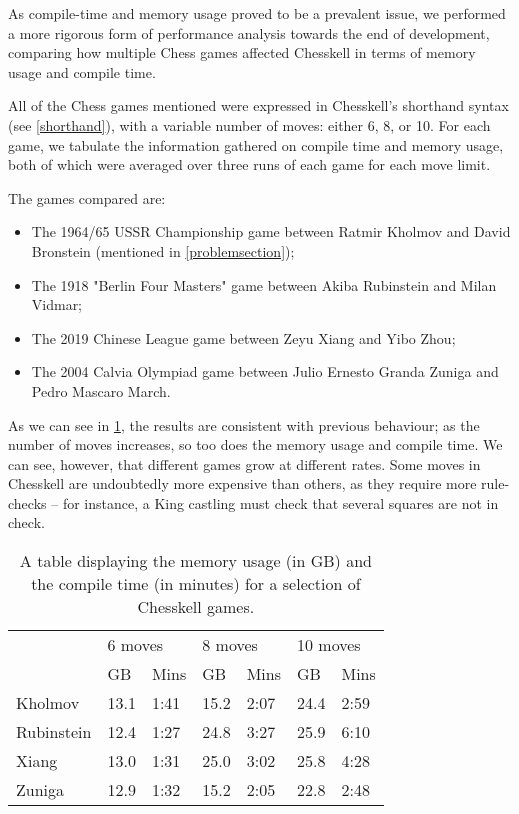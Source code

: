 As compile-time and memory usage proved to be a prevalent issue, we performed a more rigorous form of performance analysis towards the end of development, comparing how multiple Chess games affected Chesskell in terms of memory usage and compile time.

All of the Chess games mentioned were expressed in Chesskell's shorthand syntax (see \cref{shorthand}), with a variable number of moves: either 6, 8, or 10. For each game, we tabulate the information gathered on compile time and memory usage, both of which were averaged over three runs of each game for each move limit.

The games compared are:

\begin{itemize}
    \item The 1964/65 USSR Championship game between Ratmir Kholmov and David Bronstein (mentioned in \cref{problemsection});
    \item The 1918 "Berlin Four Masters" game between Akiba Rubinstein and Milan Vidmar;
    \item The 2019 Chinese League game between Zeyu Xiang and Yibo Zhou;
    \item The 2004 Calvia Olympiad game between Julio Ernesto Granda Zuniga and Pedro Mascaro March.
\end{itemize}

As we can see in \cref{performancetable}, the results are consistent with previous behaviour; as the number of moves increases, so too does the memory usage and compile time. We can see, however, that different games grow at different rates. Some moves in Chesskell are undoubtedly more expensive than others, as they require more rule-checks -- for instance, a King castling must check that several squares are not in check.

\begin{table}[h]
    \centering
    \label{performancetable}
    \begin{tabular}{l|ll|ll|ll}
                   & \multicolumn{2}{|l|}{6 moves} & \multicolumn{2}{|l|}{8 moves} & \multicolumn{2}{|l}{10 moves}                      \\
                   & GB                            & Mins                          & GB                            & Mins & GB   & Mins \\
        \hline
        Kholmov    & 13.1                          & 1:41                          & 15.2                          & 2:07 & 24.4 & 2:59 \\
        Rubinstein & 12.4                          & 1:27                          & 24.8                          & 3:27 & 25.9 & 6:10 \\
        Xiang      & 13.0                          & 1:31                          & 25.0                          & 3:02 & 25.8 & 4:28 \\
        Zuniga     & 12.9                          & 1:32                          & 15.2                          & 2:05 & 22.8 & 2:48
    \end{tabular}
    \caption{A table displaying the memory usage (in GB) and the compile time (in minutes) for a selection of Chesskell games.}
\end{table}

